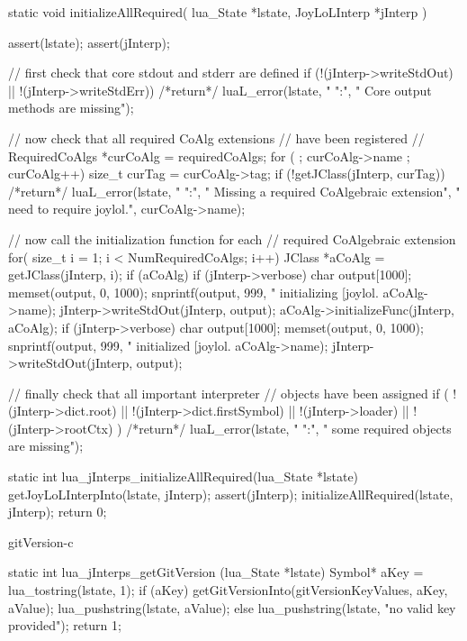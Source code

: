 \startCCode
static void initializeAllRequired(
  lua_State    *lstate,
  JoyLoLInterp *jInterp
) {
  assert(lstate);
  assert(jInterp);
  
  // first check that core stdout and stderr are defined
  if (!(jInterp->writeStdOut) || !(jInterp->writeStdErr)) {
    /*return*/ luaL_error(lstate, "%
      "\nERROR:\n",
      "  Core output methods are missing\n");
  }
  
  // now check that all required CoAlg extensions 
  // have been registered
  //
  RequiredCoAlgs *curCoAlg = requiredCoAlgs;
  for ( ; curCoAlg->name ; curCoAlg++) {
    size_t curTag = curCoAlg->tag;
    if (!getJClass(jInterp, curTag)) {
      /*return*/ luaL_error(lstate, "%
        "\nERROR:\n",
       "  Missing a required CoAlgebraic extension\n",
       "  need to require joylol.",
       curCoAlg->name);
    }
  }

  // now call the initialization function for each 
  // required CoAlgebraic extension
  for( size_t i = 1; i < NumRequiredCoAlgs; i++) {
    JClass *aCoAlg = getJClass(jInterp, i);
    if (aCoAlg) {
      if (jInterp->verbose) {
        char output[1000];
        memset(output, 0, 1000);
        snprintf(output, 999, 
          "    initializing [joylol.%
          aCoAlg->name);
        jInterp->writeStdOut(jInterp, output);
      }
      aCoAlg->initializeFunc(jInterp, aCoAlg);
      if (jInterp->verbose) {
        char output[1000];
        memset(output, 0, 1000);
        snprintf(output, 999, 
          "    initialized [joylol.%
          aCoAlg->name);
        jInterp->writeStdOut(jInterp, output);
      }
    }
  }
  
  // finally check that all important interpreter 
  // objects have been assigned
  if (
    !(jInterp->dict.root) || 
    !(jInterp->dict.firstSymbol) ||
    !(jInterp->loader) ||
    !(jInterp->rootCtx)
    ) {
      /*return*/ luaL_error(lstate, "%
        "\nERROR:\n",
        "  some required objects are missing\n\n");
    }
}

static int lua_jInterps_initializeAllRequired(lua_State *lstate) {
  getJoyLoLInterpInto(lstate, jInterp);
  assert(jInterp);
  initializeAllRequired(lstate, jInterp);
  return 0;
}
\stopCCode

\component gitVersion-c

\startCCode
static int lua_jInterps_getGitVersion (lua_State *lstate) {
  Symbol* aKey   = lua_tostring(lstate, 1);
  if (aKey) {
    getGitVersionInto(gitVersionKeyValues, aKey, aValue);
    lua_pushstring(lstate, aValue);
  } else {
    lua_pushstring(lstate, "no valid key provided");
  }
  return 1;
}
\stopCCode

